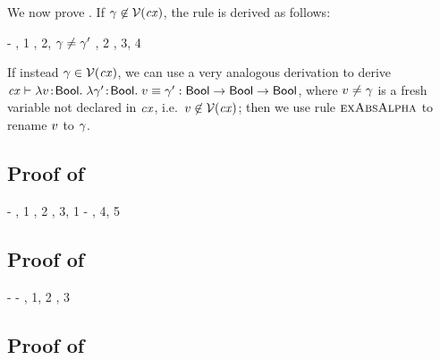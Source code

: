 We now prove \Reiff. If $\gamma\not\in\mathcal{V}(\mathit{cx})$, the rule is derived as
follows:
\begin{derivation}
\step{\cxwfO}
     {\hyp}
\step{\cxwf{\snoc{\cx}{\vdec{\varfx}{\bool}}}}
     {\Rcxvdecbool, 1}
     {\RtmpI, 2, $\gamma\neq\gamma'$}
\step{\istyO{\bool}}
     {, 2}
     {\Reabs, 3, 4}
\end{derivation}
If instead $\gamma\in\mathcal{V}(\mathit{cx})$, we can use a very analogous derivation to
derive
$\mathit{cx}\vdash\lambda v\!:\!\mathsf{Bool}.\;\lambda\gamma'\!:\!\mathsf{Bool}.\;v\equiv\gamma':\mathsf{Bool}\to\mathsf{Bool}\to\mathsf{Bool}$,
where $v\neq\gamma$ is a fresh variable not declared in $\mathit{cx}$, i.e.\
$v\not\in\mathcal{V}(\mathit{cx})$; then we use rule $\textsc{exAbsAlpha}$ to rename $v$ to
$\gamma$.



\subsection*{Proof of }

\begin{derivation}
     {\hyp}
\step{\cxwfO}
     {, 1}
\step{\hastyO{\iiffop}{\tarr{\bool}{\tarr{\bool}{\bool}}}}
     {\Reiff, 2}
     {\Reapp, 3, 1}
     {\hyp}
     {\Reapp, 4, 5}
\end{derivation}



\subsection*{Proof of \thmref{thm-eneq}}

\begin{derivation}
     {\hyp}
     {\hyp}
\step{\hastyO{\eqO}{\bool}}
     {\Reeq, 1, 2}
\step{\hastyO{\nega{(\eqO)}}{\bool}}
     {\Renega, 3}
\end{derivation}



\subsection*{Proof of }

